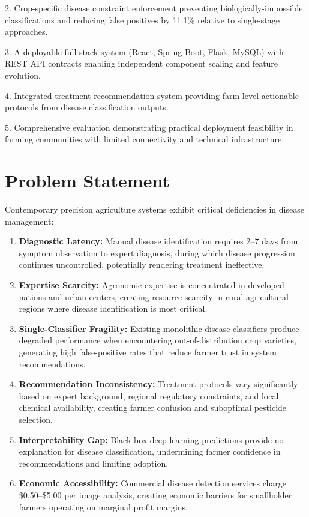 \documentclass[conference]{IEEEtran}
\begin{document}
2. Crop-specific disease constraint enforcement preventing biologically-impossible classifications and reducing false positives by 11.1\% relative to single-stage approaches.

3. A deployable full-stack system (React, Spring Boot, Flask, MySQL) with REST API contracts enabling independent component scaling and feature evolution.

4. Integrated treatment recommendation system providing farm-level actionable protocols from disease classification outputs.

5. Comprehensive evaluation demonstrating practical deployment feasibility in farming communities with limited connectivity and technical infrastructure.

\section{Problem Statement}

Contemporary precision agriculture systems exhibit critical deficiencies in disease management:

\begin{enumerate}
\item \textbf{Diagnostic Latency:} Manual disease identification requires 2--7 days from symptom observation to expert diagnosis, during which disease progression continues uncontrolled, potentially rendering treatment ineffective.

\item \textbf{Expertise Scarcity:} Agronomic expertise is concentrated in developed nations and urban centers, creating resource scarcity in rural agricultural regions where disease identification is most critical.

\item \textbf{Single-Classifier Fragility:} Existing monolithic disease classifiers produce degraded performance when encountering out-of-distribution crop varieties, generating high false-positive rates that reduce farmer trust in system recommendations.

\item \textbf{Recommendation Inconsistency:} Treatment protocols vary significantly based on expert background, regional regulatory constraints, and local chemical availability, creating farmer confusion and suboptimal pesticide selection.

\item \textbf{Interpretability Gap:} Black-box deep learning predictions provide no explanation for disease classification, undermining farmer confidence in recommendations and limiting adoption.

\item \textbf{Economic Accessibility:} Commercial disease detection services charge \$0.50--\$5.00 per image analysis, creating economic barriers for smallholder farmers operating on marginal profit margins.
\end{enumerate}
\end{document}
